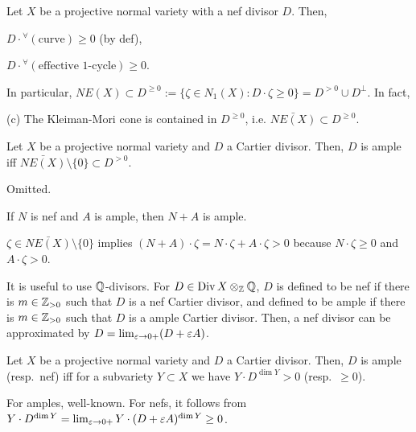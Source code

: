 \documentclass{../../small}
\DeclareMathOperator{\Div}{Div}
\begin{document}
\begin{rmk}
Let $X$ be a projective normal variety with a nef divisor $D$.
Then,
\begin{parts}
\item $D\cdot{}^\forall(\text{curve})\ge0$ (by def),
\item $D\cdot{}^\forall(\text{effective 1-cycle})\ge0$.
\end{parts}
In particular, $NE(X)\subset D^{\ge0}:=\{\zeta\in N_1(X):D\cdot\zeta\ge0\}=D^{>0}\cup D^\perp$.
In fact,
\begin{parts}
\item[(c)] The Kleiman-Mori cone is contained in $D^{\ge0}$, i.e. $\bar{NE(X)}\subset D^{\ge0}$.
\end{parts}
\end{rmk}

\begin{thm}
Let $X$ be a projective normal variety and $D$ a Cartier divisor.
Then, $D$ is ample iff $\bar{NE(X)}\setminus\{0\}\subset D^{>0}$.
\end{thm}
\begin{pf}
Omitted.
\end{pf}
\begin{cor}
If $N$ is nef and $A$ is ample, then $N+A$ is ample.
\end{cor}
\begin{pf}
$\zeta\in\bar{NE(X)}\setminus\{0\}$ implies $(N+A)\cdot\zeta=N\cdot\zeta+A\cdot\zeta>0$ because $N\cdot\zeta\ge0$ and $A\cdot\zeta>0$.
\end{pf}

\begin{rmk}
It is useful to use $\mathbb{Q}$-divisors.
For $D\in\Div X\otimes_\Z\Q$, $D$ is defined to be nef if there is $m\in\mathbb{Z}_{>0}$ such that $D$ is a nef Cartier divisor, and defined to be ample if there is $m\in\mathbb{Z}_{>0}$ such that $D$ is a ample Cartier divisor.
Then, a nef divisor can be approximated by $D=\lim_{\varepsilon\to0+}(D+\varepsilon A)$.
\end{rmk}

\begin{thm}
Let $X$ be a projective normal variety and $D$ a Cartier divisor.
Then, $D$ is ample (resp.~nef) iff for a subvariety $Y\subset X$ we have $Y\cdot D^{\dim Y}>0$ (resp.~$\ge0$).
\end{thm}
\begin{pf}
For amples, well-known.
For nefs, it follows from $Y\cdot D^{\dim Y}=\lim_{\varepsilon\to0+}Y\cdot(D+\varepsilon A)^{\dim Y}\ge0$.
\end{pf}
\end{document}
